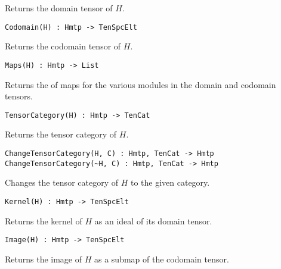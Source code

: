 Returns the domain tensor of $H$.

\color{blue}
{\small \begin{verbatim}
Codomain(H) : Hmtp -> TenSpcElt
\end{verbatim} }
\color{black}

Returns the codomain tensor of $H$.

\color{blue}
{\small \begin{verbatim}
Maps(H) : Hmtp -> List
\end{verbatim} }
\color{black}

Returns the of maps for the various modules in the domain and codomain 
tensors.

\color{blue}
{\small \begin{verbatim}
TensorCategory(H) : Hmtp -> TenCat
\end{verbatim} }
\color{black}

Returns the tensor category of $H$.

\color{blue}
{\small \begin{verbatim}
ChangeTensorCategory(H, C) : Hmtp, TenCat -> Hmtp
ChangeTensorCategory(~H, C) : Hmtp, TenCat -> Hmtp
\end{verbatim} }
\color{black}

Changes the tensor category of $H$ to the given category.

\color{blue}
{\small \begin{verbatim}
Kernel(H) : Hmtp -> TenSpcElt
\end{verbatim} }
\color{black}

Returns the kernel of $H$ as an ideal of its domain tensor.

\color{blue}
{\small \begin{verbatim}
Image(H) : Hmtp -> TenSpcElt
\end{verbatim} }
\color{black}

Returns the image of $H$ as a submap of the codomain tensor.

